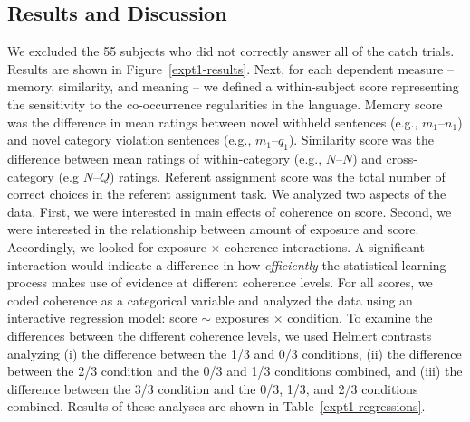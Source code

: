 \documentclass[man,floatsintext]{apa6}
\begin{document}
\subsection{Results and Discussion}
We excluded the 55 subjects who did not correctly answer all of the catch trials. Results are shown in Figure~\ref{expt1-results}. Next, for each dependent measure -- memory, similarity, and meaning -- we defined a within-subject score representing the sensitivity to the co-occurrence regularities in the language. Memory score was the difference in mean ratings between novel withheld sentences (e.g., $m_1$--$n_1$) and novel category violation sentences (e.g., $m_1$--$q_1$). Similarity score was the difference between mean ratings of within-category (e.g., $N$--$N$) and cross-category (e.g $N$--$Q$) ratings. Referent assignment score was the total number of correct choices in the referent assignment task. We analyzed two aspects of the data. First, we were interested in main effects of coherence on score. Second, we were interested in the relationship between amount of exposure and score. Accordingly, we looked for exposure $\times$ coherence interactions. A significant interaction would indicate a difference in how \emph{efficiently} the statistical learning process makes use of evidence at different coherence levels. For all scores, we coded coherence as a categorical variable and analyzed the data using an interactive regression model: score $\sim$ exposures $\times$ condition. To examine the differences between the different coherence levels, we used Helmert contrasts analyzing (i) the difference between the 1/3 and 0/3 conditions, (ii) the difference between the 2/3 condition and the 0/3 and 1/3 conditions combined, and (iii) the difference between the 3/3 condition and the 0/3, 1/3, and 2/3 conditions combined. Results of these analyses are shown in Table~\ref{expt1-regressions}.

\newcommand{\ww}{\color{white}{*}}
\newcommand\T{\rule{0pt}{2.1ex}}
\end{document}
